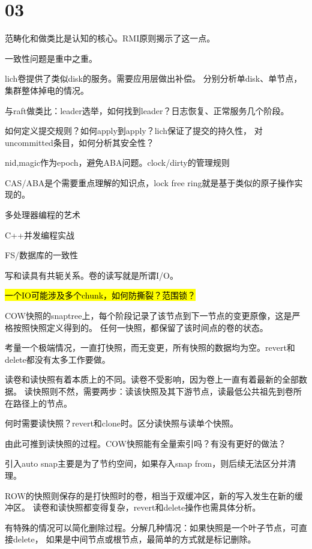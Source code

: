 \section{03}

\hrulefill

范畴化和做类比是认知的核心。RMI原则揭示了这一点。

一致性问题是重中之重。

lich卷提供了类似disk的服务。需要应用层做出补偿。
分别分析单disk、单节点，集群整体掉电的情况。

与raft做类比：leader选举，如何找到leader？日志恢复、正常服务几个阶段。

如何定义提交规则？如何apply到apply？lich保证了提交的持久性，
对uncommitted条目，如何分析其安全性？

nid,magic作为epoch，避免ABA问题。clock/dirty的管理规则

CAS/ABA是个需要重点理解的知识点，lock free ring就是基于类似的原子操作实现的。

多处理器编程的艺术

C++并发编程实战

FS/数据库的一致性

\hrulefill

写和读具有共轭关系。卷的读写就是所谓I/O。

\hl{一个IO可能涉及多个chunk，如何防撕裂？范围锁？}

COW快照的snaptree上，每个阶段记录了该节点到下一节点的变更原像，这是严格按照快照定义得到的。
任何一快照，都保留了该时间点的卷的状态。

考量一个极端情况，一直打快照，而无变更，所有快照的数据均为空。revert和delete都没有太多工作要做。

读卷和读快照有着本质上的不同。读卷不受影响，因为卷上一直有着最新的全部数据。
读快照则不然，需要两步：读该快照及其下游节点，读最低公共祖先到卷所在路径上的节点。

何时需要读快照？revert和clone时。区分读快照与读单个快照。

由此可推到读快照的过程。COW快照能有全量索引吗？有没有更好的做法？

引入auto snap主要是为了节约空间，如果存入snap from，则后续无法区分并清理。

\hrulefill

ROW的快照则保存的是打快照时的卷，相当于双缓冲区，新的写入发生在新的缓冲区。
读卷和读快照都变得复杂，revert和delete操作也需具体分析。

有特殊的情况可以简化删除过程。分解几种情况：如果快照是一个叶子节点，可直接delete，
如果是中间节点或根节点，最简单的方式就是标记删除。
